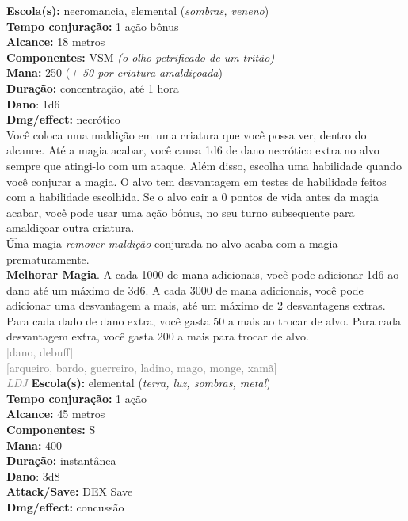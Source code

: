 \documentclass{RPG_Adventure}[2021/10/20]
\begin{document}
{\small \t \textbf{Escola(s):} necromancia, elemental (\textit{sombras, veneno})\\\t \textbf{Tempo conjuração:} 1 ação bônus\\\t \textbf{Alcance:} 18 metros\\\t \textbf{Componentes:} VSM \textit{(o olho petrificado de um tritão)}\\\t \textbf{Mana:} 250 (\textit{+ 50 por criatura amaldiçoada})\\\t \textbf{Duração:} concentração, até 1 hora\\\t \textbf{Dano}: 1d6\\\t \textbf{Dmg/effect:} necrótico\\}
{\normalsize Você coloca uma maldição em uma criatura que você possa ver, dentro do alcance. Até a magia acabar, você causa 1d6 de dano necrótico extra no alvo sempre que atingi-lo com um ataque. Além disso, escolha uma habilidade quando você conjurar a magia. O alvo tem desvantagem em testes de habilidade feitos com a habilidade escolhida.  Se o alvo cair a 0 pontos de vida antes da magia acabar, você pode usar uma ação bônus, no seu turno subsequente para amaldiçoar outra criatura.\\\t Uma magia \textit{remover maldição} conjurada no alvo acaba com a magia prematuramente.\\\t \textbf{Melhorar Magia}. A cada 1000 de mana adicionais, você pode adicionar 1d6 ao dano até um máximo de 3d6. A cada 3000 de mana adicionais, você pode adicionar uma desvantagem a mais, até um máximo de 2 desvantagens extras. Para cada dado de dano extra, você gasta 50 a mais ao trocar de alvo. Para cada desvantagem extra, você gasta 200 a mais para trocar de alvo.\\}
{\scriptsize \textcolor{gray}{[dano, debuff]\\}}
{\scriptsize \textcolor{gray}{[arqueiro, bardo, guerreiro, ladino, mago, monge, xamã]\\}}
{\tiny \textcolor{gray}{\textit{LDJ}}}\jump{}
{\small \t \textbf{Escola(s):} elemental (\textit{terra, luz, sombras, metal})\\\t \textbf{Tempo conjuração:} 1 ação\\\t \textbf{Alcance:} 45 metros\\\t \textbf{Componentes:} S\\\t \textbf{Mana:} 400\\\t \textbf{Duração:} instantânea\\\t \textbf{Dano}: 3d8\\\t \textbf{Attack/Save:} DEX Save\\\t \textbf{Dmg/effect:} concussão\\}
\end{document}
